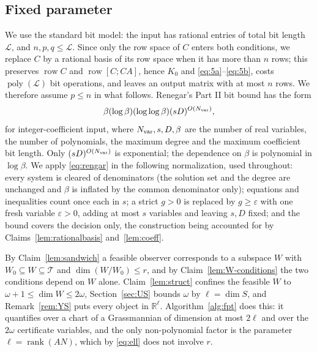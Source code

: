 \documentclass[journal]{IEEEtran}
\theoremstyle{plainn}
\theoremstyle{remark}
\begin{document}
\subsection{Fixed parameter}\label{sec:fpt}

We use the standard bit model: the input has rational entries of total bit length $\mathcal L$,
and $n,p,q\le\mathcal L$. Since only the row space of $C$ enters both conditions, we replace $C$ by
a rational basis of its row space when it has more than $n$ rows; this preserves $\operatorname{row}C$
and $\operatorname{row}[C;CA]$, hence $K_0$ and \eqref{eq:5a}--\eqref{eq:5b}, costs
$\operatorname{poly}(\mathcal L)$ bit operations, and leaves an output matrix with at most $n$ rows.
We therefore assume $p\le n$ in what follows. Renegar's Part II bit bound
\cite{ren92} has the form
\begin{equation}\label{eq:rengar}
\beta(\log\beta)(\log\log\beta)(sD)^{O(N_{\rm var})},
\end{equation}
for integer-coefficient input, where $N_{\rm var},s,D,\beta$ are the number of real variables, the number of
polynomials, the maximum degree and the maximum coefficient bit length. Only $(sD)^{O(N_{\rm var})}$ is
exponential; the dependence on $\beta$ is polynomial in $\log\beta$. We apply \eqref{eq:rengar} in the
following normalization, used throughout: every system is cleared of denominators (the solution set
and the degree are unchanged and $\beta$ is inflated by the common denominator only); equations and
inequalities count once each in $s$; a strict $g>0$ is replaced by $g\ge\varepsilon$ with one fresh
variable $\varepsilon>0$, adding at most $s$ variables and leaving $s,D$ fixed; and the bound covers
the decision only, the construction being accounted for by Claims~\ref{lem:rationalbasis}
and~\ref{lem:coeff}.

By Claim~\ref{lem:sandwich} a feasible observer corresponds to a subspace $W$ with
$W_0\subseteq W\subseteq\mathcal T$ and $\dim(W/W_0)\le r$, and by Claim~\ref{lem:W-conditions} the
two conditions depend on $W$ alone. Claim~\ref{lem:struct} confines the feasible $W$ to
$\omega+1\le\dim W\le2\omega$, Section~\ref{sec:US} bounds $\omega$ by $\ell=\dim S$, and
Remark~\ref{rem:YS} puts every object in
$\mathbb R^\ell$. Algorithm~\ref{alg:fpt} does this: it quantifies over a chart of a Grassmannian of dimension at most
$2\ell$ and over the $2\omega$ certificate variables, and the only non-polynomial factor
is the parameter $\ell=\operatorname{rank}(AN)$, which by \eqref{eq:ell} does not involve $r$.
\end{document}
